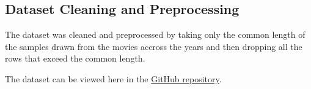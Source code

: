 \subsection{Dataset Cleaning and Preprocessing}
\label{sec:dataset_cleaning}
The dataset was cleaned and preprocessed by taking only the common length of the samples drawn from the movies accross the years and then dropping all the rows that exceed the common length. 

The dataset can be viewed here in the \href{https://github.com/ARna06/study-on-colorism/tree/main/data}{GitHub repository}.